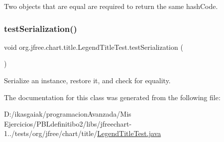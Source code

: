 Two objects that are equal are required to return the same hash\+Code. \mbox{\label{classorg_1_1jfree_1_1chart_1_1title_1_1_legend_title_test_a825b63faafd8d94f41f6ca4fc70dca4f}} 
\subsubsection{\texorpdfstring{test\+Serialization()}{testSerialization()}}
{\footnotesize\ttfamily void org.\+jfree.\+chart.\+title.\+Legend\+Title\+Test.\+test\+Serialization (\begin{DoxyParamCaption}{ }\end{DoxyParamCaption})}

Serialize an instance, restore it, and check for equality. 

The documentation for this class was generated from the following file\+:\begin{DoxyCompactItemize}
\item 
D\+:/ikasgaiak/programacion\+Avanzada/\+Mis Ejercicios/\+P\+B\+Ldefinitibo2/libs/jfreechart-\/1../tests/org/jfree/chart/title/\mbox{\hyperlink{_legend_title_test_8java}{Legend\+Title\+Test.\+java}}\end{DoxyCompactItemize}
